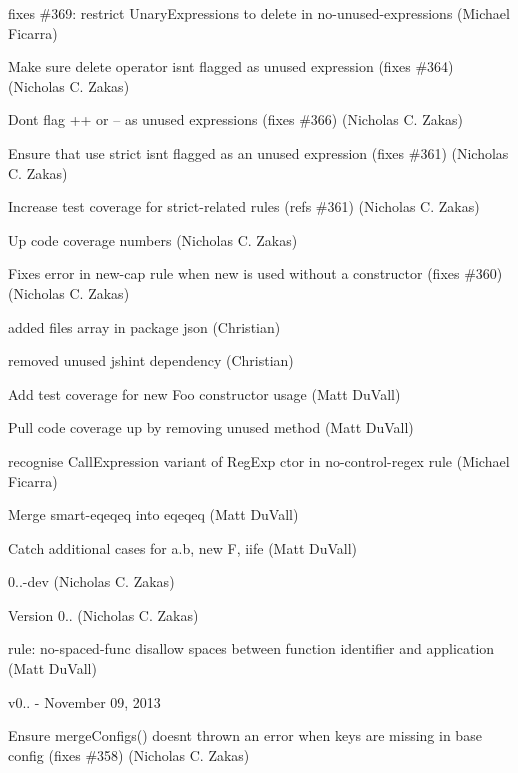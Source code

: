 \begin{DoxyItemize}
\item fixes \#369\+: restrict Unary\+Expressions to delete in no-\/unused-\/expressions (Michael Ficarra)
\item Make sure delete operator isn\textquotesingle{}t flagged as unused expression (fixes \#364) (Nicholas C. Zakas)
\item Don\textquotesingle{}t flag ++ or -- as unused expressions (fixes \#366) (Nicholas C. Zakas)
\item Ensure that \textquotesingle{}use strict\textquotesingle{} isn\textquotesingle{}t flagged as an unused expression (fixes \#361) (Nicholas C. Zakas)
\item Increase test coverage for strict-\/related rules (refs \#361) (Nicholas C. Zakas)
\item Up code coverage numbers (Nicholas C. Zakas)
\item Fixes error in new-\/cap rule when \textquotesingle{}new\textquotesingle{} is used without a constructor (fixes \#360) (Nicholas C. Zakas)
\item added files array in package json (Christian)
\item removed unused jshint dependency (Christian)
\item Add test coverage for new Foo constructor usage (Matt Du\+Vall)
\item Pull code coverage up by removing unused method (Matt Du\+Vall)
\item recognise Call\+Expression variant of Reg\+Exp ctor in no-\/control-\/regex rule (Michael Ficarra)
\item Merge smart-\/eqeqeq into eqeqeq (Matt Du\+Vall)
\item Catch additional cases for a.\+b, new F, iife (Matt Du\+Vall)
\item 0..-\/dev (Nicholas C. Zakas)
\item Version 0.. (Nicholas C. Zakas)
\item rule\+: no-\/spaced-\/func disallow spaces between function identifier and application (Matt Du\+Vall)
\end{DoxyItemize}

v0.. -\/ November 09, 2013


\begin{DoxyItemize}
\item Ensure merge\+Configs() doesn\textquotesingle{}t thrown an error when keys are missing in base config (fixes \#358) (Nicholas C. Zakas)
\end{DoxyItemize}

